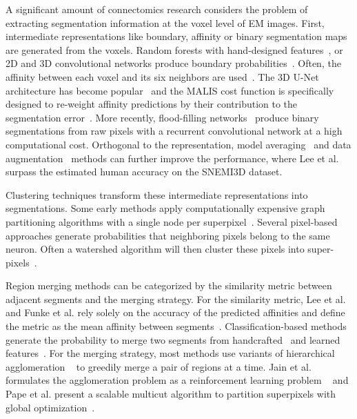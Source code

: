 A significant amount of connectomics research considers the problem of extracting segmentation information at the voxel level of EM images.
First, intermediate representations like boundary, affinity or binary segmentation maps are generated from the voxels.
Random forests with hand-designed features~\cite{kaynig2015large}, or 2D and 3D convolutional networks produce boundary probabilities~\cite{bogovic2013learned,ciresan2012deep,jain2010boundary,seymour2016rhoananet,ronneberger2015u,amelio_segmentation}.
Often, the affinity between each voxel and its six neighbors are used~\cite{cciccek20163d,lee2015recursive,lee2017superhuman,parag2017anisotropic,turaga2010convolutional}. 
The 3D U-Net architecture has become popular~\cite{cciccek20163d} and the MALIS cost function is specifically designed to re-weight affinity predictions by their contribution to the segmentation error~\cite{briggman2009maximin}.
More recently, flood-filling networks~\cite{januszewski2016flood} produce binary segmentations from raw pixels with a recurrent convolutional network at a high computational cost.
Orthogonal to the representation, model averaging~\cite{zeng2017deepem3d} and data augmentation~\cite{lee2017superhuman} methods can further improve the performance, where Lee et al.~\cite{lee2017superhuman} surpass the estimated human accuracy on the SNEMI3D dataset.

Clustering techniques transform these intermediate representations into segmentations.
Some early methods apply computationally expensive graph partitioning algorithms with a single node per superpixel~\cite{andres2012globally}.
Several pixel-based approaches generate probabilities that neighboring pixels belong to the same neuron.
Often a watershed algorithm will then cluster these pixels into super-pixels~\cite{zlateski2015image}.

Region merging methods can be categorized by the similarity metric between adjacent segments and the merging strategy.
For the similarity metric, Lee et al. and Funke et al. rely solely on the accuracy of the predicted affinities and define the metric as the mean affinity between segments~\cite{funke2017deep,lee2017superhuman}.
Classification-based methods generate the probability to merge two segments from handcrafted~\cite{jain2011learning,seymour2016rhoananet,nunez2014graph,10.1371/journal.pone.0125825,parag2017anisotropic,zlateski2015image} and learned features~\cite{bogovic2013learned}. 
For the merging strategy, most methods use variants of hierarchical agglomeration ~\cite{seymour2016rhoananet,nunez2014graph,10.1371/journal.pone.0125825,parag2017anisotropic,zlateski2015image} to greedily merge a pair of regions at a time.
Jain et al. formulates the agglomeration problem as a reinforcement learning problem ~\cite{jain2011learning} and Pape et al. present a scalable multicut algorithm to partition superpixels with global optimization~\cite{beier2017multicut}.

